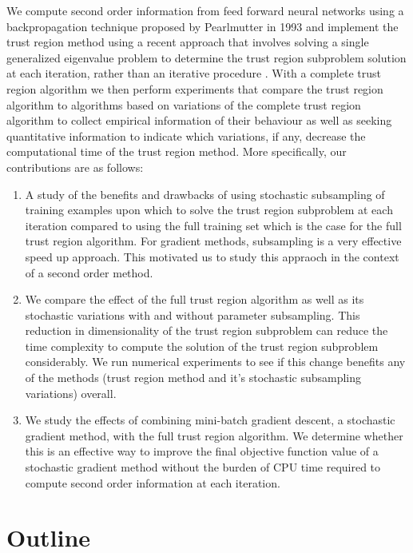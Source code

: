 \documentclass[letterpaper,12pt,titlepage,oneside,final]{book}
\begin{document}
	We compute second order information from feed forward neural networks using a backpropagation technique proposed by Pearlmutter in 1993 \cite{Pearlmutter.1993} and implement the trust region method using a recent approach that involves solving a single generalized eigenvalue problem to determine the trust region subproblem solution at each iteration, rather than an iterative procedure \cite{adachi.paper}. With a complete trust region algorithm we then perform experiments that compare the trust region algorithm to algorithms based on variations of the complete trust region algorithm to collect empirical information of their behaviour as well as seeking quantitative information to indicate which variations, if any, decrease the computational time of the trust region method. More specifically, our contributions are as follows:
	
	\begin{enumerate}
		\item{A study of the benefits and drawbacks of using stochastic subsampling of training examples upon which to solve the trust region subproblem at each iteration compared to using the full training set which is the case for the full trust region algorithm. For gradient methods, subsampling is a very effective speed up approach. This motivated us to study this appraoch in the context of a second order method.}
		\item{We compare the effect of the full trust region algorithm as well as its stochastic variations with and without parameter subsampling. This reduction in dimensionality of the trust region subproblem can reduce the time complexity to compute the solution of the trust region subproblem considerably. We run numerical experiments to see if this change benefits any of the methods (trust region method and it's stochastic subsampling variations) overall.}
		\item{We study the effects of combining mini-batch gradient descent, a stochastic gradient method, with the full trust region algorithm. We determine whether this is an effective way to improve the final objective function value of a stochastic gradient method without the burden of CPU time required to compute second order information at each iteration.}
	\end{enumerate}
	
	
	\section{Outline}
	
\end{document}
